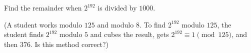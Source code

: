 Find the remainder when $2^{192}$ is divided by $1000$.

(A student works modulo $125$ and modulo $8$. To find $2^{192}$ modulo $125$, the student finds $2^{192}$ modulo $5$ and cubes the result, gets $2^{192}\equiv1\pmod{125}$, and then $376$. Is this method correct?)
